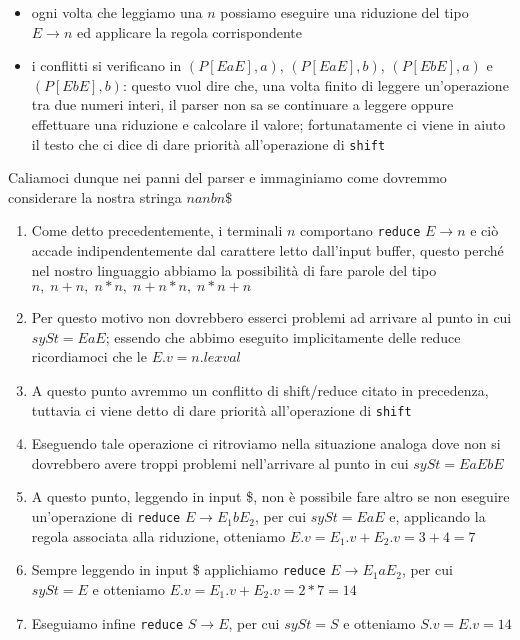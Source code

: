 \documentclass[class=book, crop=false, oneside, 12pt]{standalone}
\begin{document}
\begin{itemize}
    \item ogni volta che leggiamo una \(n\) possiamo eseguire una riduzione del tipo \(E \to n\) ed applicare la regola corrispondente
    \item i conflitti si verificano in \((P[EaE],a)\), \((P[EaE],b)\), \((P[EbE],a)\) e \((P[EbE],b)\): questo vuol dire che, una volta finito di leggere un'operazione tra due numeri interi, il parser non sa se continuare a leggere oppure effettuare una riduzione e calcolare il valore; fortunatamente ci viene in aiuto il testo che ci dice di dare priorità all'operazione di \texttt{shift}
\end{itemize}

Caliamoci dunque nei panni del parser e immaginiamo come dovremmo considerare la nostra stringa \(nanbn\$\)

\begin{enumerate}
    \item Come detto precedentemente, i terminali \(n\) comportano \texttt{reduce} \(E \to n\) e ciò accade indipendentemente dal carattere letto dall'input buffer, questo perché nel nostro linguaggio abbiamo la possibilità di fare parole del tipo \(n,\; n+n,\; n*n,\; n+n*n,\; n*n+n\)
    \item Per questo motivo non dovrebbero esserci problemi ad arrivare al punto in cui \(sySt = EaE\); essendo che abbimo eseguito implicitamente delle reduce ricordiamoci che le \(E.v = n.lexval\)
    \item A questo punto avremmo un conflitto di shift/reduce citato in precedenza, tuttavia ci viene detto di dare priorità all'operazione di \texttt{shift}
    \item Eseguendo tale operazione ci ritroviamo nella situazione analoga dove non si dovrebbero avere troppi problemi nell'arrivare al punto in cui \(sySt = EaEbE\)
    \item A questo punto, leggendo in input \$, non è possibile fare altro se non eseguire un'operazione di \texttt{reduce} \(E \to E_1bE_2\), per cui \(sySt = EaE\) e, applicando la regola associata alla riduzione, otteniamo \(E.v = E_1.v + E_2.v = 3 + 4 = 7\) 
    \item Sempre leggendo in input \$ applichiamo \texttt{reduce} \(E \to E_1aE_2\), per cui \(sySt = E\) e otteniamo \(E.v = E_1.v + E_2.v = 2 * 7 = 14\)
    \item Eseguiamo infine \texttt{reduce} \(S \to E\), per cui \(sySt = S\) e otteniamo \(S.v = E.v = 14\)
\end{enumerate}
\end{document}
